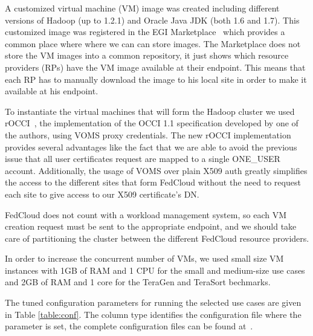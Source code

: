 A customized virtual machine (VM) image was created including different versions of Hadoop (up to 1.2.1) and Oracle Java JDK (both 1.6 and 1.7).
This customized image was registered in the EGI Marketplace~\cite{marketplace} which provides a common place where where we can can store images. The Marketplace does not store the VM images into a common repository, it just shows which resource providers (RPs) have the VM image available at their endpoint. This means that each RP has to manually download the image to his local site in order to make it available at his endpoint. 

To instantiate the virtual machines that will form the Hadoop cluster we used rOCCI~\cite{rocci}, the implementation of the OCCI 1.1 specification developed by one of the authors, using VOMS proxy credentials. The new rOCCI implementation provides several advantages like the fact that we are able to avoid the previous issue that all user certificates request are mapped to a single ONE\_USER account.
Additionally, the usage of VOMS over plain X509 auth greatly simplifies the access to the different sites that form FedCloud without the need to request each site to give access to our X509 certificate's DN.

FedCloud does not count with a workload management system, so each VM creation request must be sent to the appropriate endpoint, and we should take care of partitioning the cluster between the different FedCloud resource providers.



In order to increase the concurrent number of VMs, we used small size VM instances with 1GB of RAM and 1 CPU for the small and medium-size use cases and 2GB of RAM and 1 core for the TeraGen and TeraSort bechmarks.


The tuned configuration parameters for running the selected use cases are given in Table \ref{table:conf}. The column type identifies the configuration file where the parameter is set, the complete configuration files can be found at~\cite{scripts}.

